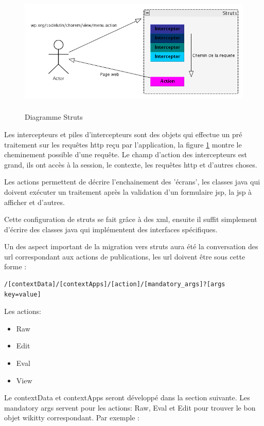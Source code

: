 \begin{figure}[!ht]
\centering
\includegraphics[height=6cm,width=17cm]{image/strutsexplain.png}
  		\caption{Diagramme Struts}
  		\label{diagstruts}
\end{figure}

Les intercepteurs et piles d'intercepteurs sont des objets qui effectue un pré
traitement sur les requêtes http reçu par l'application, la figure \ref{diagstruts}
montre le cheminement possible d'une requête. Le champ d'action des intercepteurs
est grand, ils ont accès à la session, le contexte, les requêtes http et d'autres choses.

Les actions permettent de décrire l'enchainement des 'écrans', les classes java
qui doivent exécuter un traitement après la validation d'un formulaire jsp, la
jsp à afficher et d'autres.

Cette configuration de struts se fait grâce à des xml, ensuite il suffit
simplement d'écrire des classes java qui implémentent des interfaces
spécifiques.

Un des aspect important de la migration vers struts aura été la conversation des
url correspondant aux actions de publications, les url doivent être sous cette
forme : 
\begin{verbatim}
/[contextData]/[contextApps]/[action]/[mandatory_args]?[args key=value]
\end{verbatim}

Les actions: 
\begin{itemize}
\item Raw
\item Edit
\item Eval
\item View
\end{itemize}

Le contextData et contextApps seront développé dans la section suivante. Les
mandatory args servent pour les actions: Raw, Eval et Edit pour trouver le bon 
objet wikitty correspondant. Par exemple :


